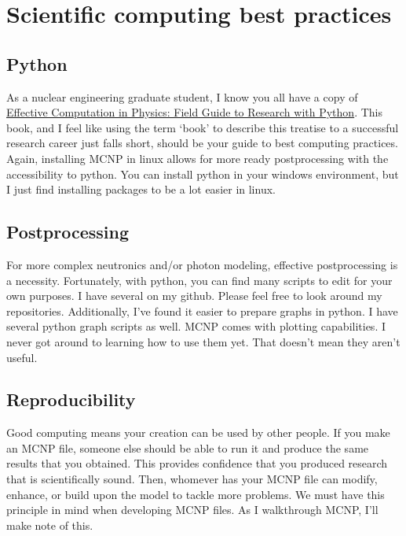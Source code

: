 \documentclass[11pt,a4paper]{article}
\begin{document}
\section{Scientific computing best practices}
\subsection{Python}
\noindent As a nuclear engineering graduate student, I know you all have a copy of \href{https://www.google.com/books/edition/Effective_Computation_in_Physics/6IkNCgAAQBAJ?hl=en&gbpv=0}{Effective Computation in Physics: Field Guide to Research with Python}. This book, and I feel like using the term `book' to describe this treatise to a successful research career just falls short, should be your guide to best computing practices. Again, installing MCNP in linux allows for more ready
postprocessing with the accessibility to python. You can install python in your windows environment, but I just find installing packages to be a lot easier in linux. 

\subsection{Postprocessing}
\noindent For more complex neutronics and/or photon modeling, effective postprocessing is a necessity. Fortunately, with python, you can find many scripts to edit for your own purposes. I have several on my github. Please feel free to look around my repositories. Additionally, I've found it easier to prepare graphs in python. I have several python graph scripts as well. MCNP comes with plotting capabilities. I never got around to learning how to use them yet. That doesn't mean they aren't useful.

\subsection{Reproducibility}
\noindent Good computing means your creation can be used by other people. If you make an MCNP file, someone else should be able to run it and produce the same results that you obtained. This provides confidence that you produced research that is scientifically sound. Then, whomever has your MCNP file can modify, enhance, or build upon the model to tackle more problems. We must have this principle in mind when developing MCNP files. As I walkthrough MCNP, I'll make note of this. 

\newpage

\end{document}
